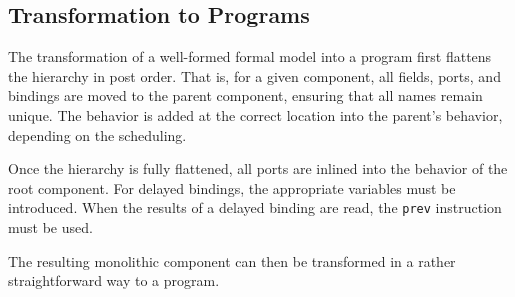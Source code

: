 \documentclass[a4paper,10pt,english]{article}
\begin{document}
\subsection{Transformation to \Fil Programs}
The transformation of a well-formed formal model into a \Fil program first flattens the hierarchy in post order. That is, for a
given component, all fields, ports, and bindings are moved to the parent component, ensuring that all names remain unique. The behavior
is added at the correct location into the parent's behavior, depending on the scheduling. 

Once the hierarchy is fully flattened, all ports are inlined into the behavior of the root component. For delayed bindings, the
appropriate variables must be introduced. When the results of a delayed binding are read, the \texttt{prev} instruction must be used.

The resulting monolithic component can then be transformed in a rather straightforward way to a \Fil program.
\end{document}
